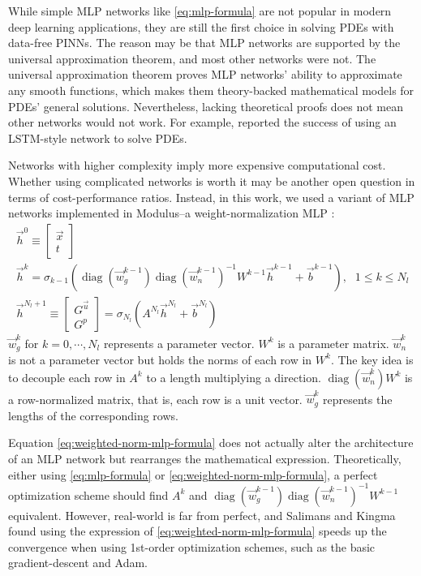 While simple MLP networks like \eqref{eq:mlp-formula} are not popular in modern deep learning applications, they are still the first choice in solving PDEs with data-free PINNs.
The reason may be that MLP networks are supported by the universal approximation theorem, and most other networks were not.
The universal approximation theorem proves MLP networks' ability to approximate any smooth functions, which makes them theory-backed mathematical models for PDEs' general solutions.
Nevertheless, lacking theoretical proofs does not mean other networks would not work.
For example, \cite{sirignano_dgm:_2018} reported the success of using an LSTM-style network to solve PDEs.

Networks with higher complexity imply more expensive computational cost.
Whether using complicated networks is worth it may be another open question in terms of cost-performance ratios. 
Instead, in this work, we used a variant of MLP networks implemented in Modulus--a weight-normalization MLP \cite{salimans_weight_2016}:
\begin{equation}\label{eq:weighted-norm-mlp-formula}
    \begin{array}{ll}
        \vec{h}^0 \equiv \begin{bmatrix} \vec{x} \\ t \end{bmatrix} & \\
        \vec{h}^k = \sigma_{k-1}\left(
            \operatorname{diag}\left(\vec{w}_g^{k-1}\right)
            \operatorname{diag}\left(\vec{w}_n^{k-1}\right)^{-1}
            W^{k-1}\vec{h}^{k-1}+\vec{b}^{k-1}
        \right)\text{,} & 1 \le k \le N_l \\
        \vec{h}^{N_l+1}\equiv \begin{bmatrix} G^{\vec{u}} \\ G^p \end{bmatrix} = \sigma_{N_l}\left(A^{N_l}\vec{h}^{N_l}+\vec{b}^{N_l}\right) &
    \end{array}
\end{equation}
$\vec{w}_g^{k}$ for $k=0,\cdots,N_l$ represents a parameter vector.
$W^k$ is a parameter matrix.
$\vec{w}_n^{k}$ is not a parameter vector but holds the norms of each row in $W^k$.
The key idea is to decouple each row in $A^k$ to a length multiplying a direction.
$\operatorname{diag}\left(\vec{w}_n^k\right)W^k$ is a row-normalized matrix, that is, each row is a unit vector.
$\vec{w}_g^k$ represents the lengths of the corresponding rows.

Equation \eqref{eq:weighted-norm-mlp-formula} does not actually alter the architecture of an MLP network but rearranges the mathematical expression.
Theoretically, either using \eqref{eq:mlp-formula} or \eqref{eq:weighted-norm-mlp-formula}, a perfect optimization scheme should find $A^k$ and $\operatorname{diag}\left(\vec{w}_g^{k-1}\right) \operatorname{diag}\left(\vec{w}_n^{k-1}\right)^{-1} W^{k-1}$ equivalent.
However, real-world is far from perfect, and Salimans and Kingma \cite{salimans_weight_2016} found using the expression of \eqref{eq:weighted-norm-mlp-formula} speeds up the convergence when using 1st-order optimization schemes, such as the basic gradient-descent and Adam.

